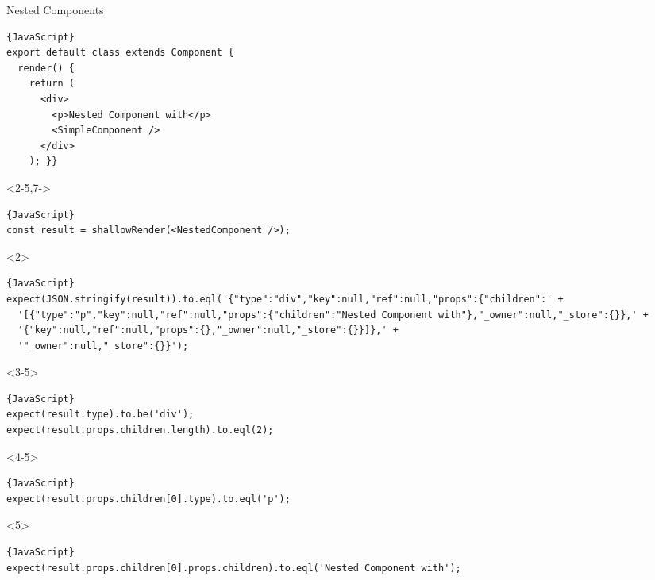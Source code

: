 \begin{frame}[fragile]{Nested Components}

\vspace{-2em}
\begin{lstlisting}{JavaScript}
export default class extends Component {
  render() {
    return (
      <div>
        <p>Nested Component with</p>
        <SimpleComponent />
      </div>
    ); }}
\end{lstlisting}

\vspace{-0.5em}

\begin{overlayarea}{\linewidth}{3cm}

\begin{onlyenv}<2-5,7->
\begin{lstlisting}{JavaScript}
const result = shallowRender(<NestedComponent />);
\end{lstlisting}
\end{onlyenv}

\begin{onlyenv}<2>
\vspace{-0.5em}
\begin{lstlisting}{JavaScript}
expect(JSON.stringify(result)).to.eql('{"type":"div","key":null,"ref":null,"props":{"children":' +
  '[{"type":"p","key":null,"ref":null,"props":{"children":"Nested Component with"},"_owner":null,"_store":{}},' +
  '{"key":null,"ref":null,"props":{},"_owner":null,"_store":{}}]},' +
  '"_owner":null,"_store":{}}');
\end{lstlisting}
\end{onlyenv}

\begin{onlyenv}<3-5>
\vspace{-0.5em}
\begin{lstlisting}{JavaScript}
expect(result.type).to.be('div');
expect(result.props.children.length).to.eql(2);
\end{lstlisting}
\end{onlyenv}

\begin{onlyenv}<4-5>
\vspace{-0.5em}
\begin{lstlisting}{JavaScript}
expect(result.props.children[0].type).to.eql('p');
\end{lstlisting}
\end{onlyenv}

\begin{onlyenv}<5>
\vspace{-0.5em}
\begin{lstlisting}{JavaScript}
expect(result.props.children[0].props.children).to.eql('Nested Component with');
\end{lstlisting}
\end{onlyenv}


\end{overlayarea}
\end{frame}
